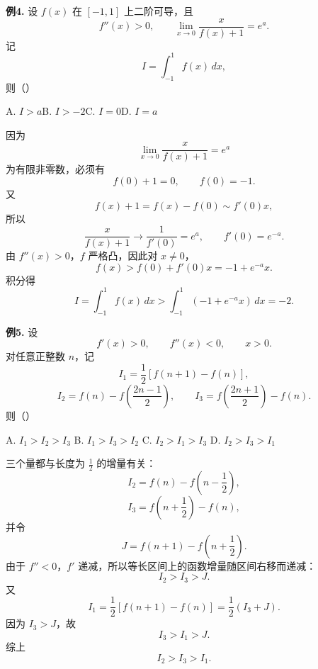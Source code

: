 \begin{problemblock}
\textbf{例4.} 设 \(f(x)\) 在 \([-1,1]\) 上二阶可导，且
\[
f''(x)>0,\qquad
\lim_{x\to0}\frac{x}{f(x)+1}=e^a.
\]
记
\[
I=\int_{-1}^1 f(x)\,dx,
\]
则（\quad）

A. \(I>a\)\qquad B. \(I>-2\)\qquad C. \(I=0\)\qquad D. \(I=a\)
\end{problemblock}
\begin{solutionblock}
因为
\[
\lim_{x\to0}\frac{x}{f(x)+1}=e^a
\]
为有限非零数，必须有
\[
f(0)+1=0,\qquad f(0)=-1.
\]
又
\[
f(x)+1=f(x)-f(0)\sim f'(0)x,
\]
所以
\[
\frac{x}{f(x)+1}\to\frac1{f'(0)}=e^a,
\qquad f'(0)=e^{-a}.
\]
由 \(f''(x)>0\)，\(f\) 严格凸，因此对 \(x\ne0\)，
\[
f(x)>f(0)+f'(0)x=-1+e^{-a}x.
\]
积分得
\[
I=\int_{-1}^{1}f(x)\,dx
>
\int_{-1}^{1}(-1+e^{-a}x)\,dx
=-2.
\]
\end{solutionblock}

\begin{problemblock}
\textbf{例5.} 设
\[
f'(x)>0,\qquad f''(x)<0,\qquad x>0.
\]
对任意正整数 \(n\)，记
\[
I_1=\frac12[f(n+1)-f(n)],
\]
\[
I_2=f(n)-f\left(\frac{2n-1}{2}\right),\qquad
I_3=f\left(\frac{2n+1}{2}\right)-f(n).
\]
则（\quad）

A. \(I_1>I_2>I_3\)\quad
B. \(I_1>I_3>I_2\)\quad
C. \(I_2>I_1>I_3\)\quad
D. \(I_2>I_3>I_1\)
\end{problemblock}
\begin{solutionblock}
三个量都与长度为 \(\frac12\) 的增量有关：
\[
I_2=f(n)-f\left(n-\frac12\right),
\]
\[
I_3=f\left(n+\frac12\right)-f(n),
\]
并令
\[
J=f(n+1)-f\left(n+\frac12\right).
\]
由于 \(f''<0\)，\(f'\) 递减，所以等长区间上的函数增量随区间右移而递减：
\[
I_2>I_3>J.
\]
又
\[
I_1=\frac12[f(n+1)-f(n)]
=\frac12(I_3+J).
\]
因为 \(I_3>J\)，故
\[
I_3>I_1>J.
\]
综上
\[
I_2>I_3>I_1.
\]
\end{solutionblock}

